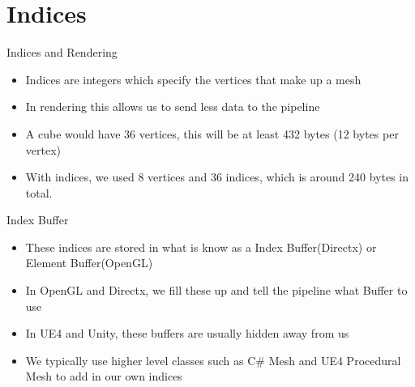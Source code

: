 \part{Indices}
\frame{\partpage}

\begin{frame}{Indices and Rendering}
	\begin{itemize}
		\item Indices are integers which specify the vertices that make up a mesh
		\pause\item In rendering this allows us to send less data to the pipeline
		\pause\item A cube would have 36 vertices, this will be at least 432 bytes (12 bytes per vertex)
		\pause\item With indices, we used 8 vertices and 36 indices, which is around 240 bytes in total.
	\end{itemize}
\end{frame}

\begin{frame}{Index Buffer}
\begin{itemize}
	\item These indices are stored in what is know as a Index Buffer(Directx) or Element Buffer(OpenGL)
	\pause \item In OpenGL and Directx, we fill these up and tell the pipeline what Buffer to use
	\pause \item In UE4 and Unity, these buffers are usually hidden away from us
	\pause \item We typically use higher level classes such as C\# Mesh and UE4 Procedural Mesh to add in our own indices 
\end{itemize}
\end{frame}